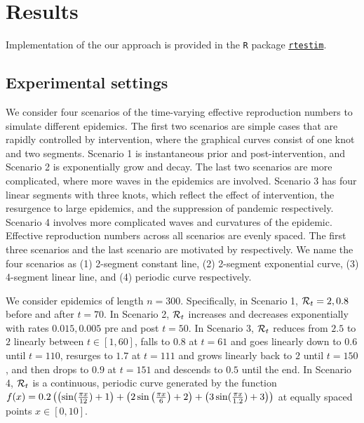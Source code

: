 \section{Results}

Implementation of the our approach is provided in the \texttt{R} package \href{https://dajmcdon.github.io/rtestim/}{\texttt{rtestim}}. 


\subsection{Experimental settings}

We consider four scenarios of the time-varying effective reproduction numbers to simulate different epidemics. The first two scenarios are simple cases that are rapidly controlled by intervention, where the graphical curves consist of one knot and two segments. Scenario 1 is instantaneous prior and post-intervention, and Scenario 2 is exponentially grow and decay. The last two scenarios are more complicated, where more waves in the epidemics are involved. Scenario 3 has four linear segments with three knots, which reflect the effect of intervention, the resurgence to large epidemics, and the suppression of pandemic respectively. Scenario 4 involves more complicated waves and curvatures of the epidemic. Effective reproduction numbers across all scenarios are evenly spaced. 
The first three scenarios and the last scenario are motivated by \cite{parag2021improved, gressani2022epilps} respectively. 
We name the four scenarios as (1) 2-segment constant line, (2) 2-segment exponential curve, (3) 4-segment linear line, and (4) periodic curve respectively. 

We consider epidemics of length $n=300$. 
Specifically, in Scenario 1, $\mathcal{R}_t = 2, 0.8$ before and after $t=70$. In Scenario 2, $\mathcal{R}_t$ increases and decreases exponentially with rates $0.015, 0.005$ pre and post $t=50$. In Scenario 3, $\mathcal{R}_t$ reduces from $2.5$ to $2$ linearly between $t\in[1,60]$, falls to $0.8$ at $t=61$ and goes linearly down to $0.6$ until $t=110$, resurges to $1.7$ at $t=111$ and grows linearly back to $2$ until $t=150$, and then drops to $0.9$ at $t=151$ and descends to $0.5$ until the end. In Scenario 4, $\mathcal{R}_t$ is a continuous, periodic curve generated by the function $f(x) = 0.2 \left( \left(\sin(\frac{\pi x}{12}) + 1\right) + \left(2 \sin\left(\frac{\pi x}{6}\right) + 2\right) + \left(3 \sin(\frac{\pi x}{1.2}) + 3\right) \right)$ at equally spaced points $x\in [0,10]$. 


